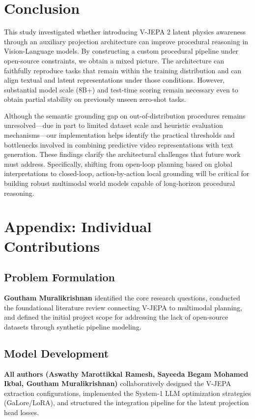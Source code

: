 \documentclass{article}
\begin{document}
\section{Conclusion}
This study investigated whether introducing V-JEPA 2 latent physics awareness through an auxiliary projection architecture can improve procedural reasoning in Vision-Language models. By constructing a custom procedural pipeline under open-source constraints, we obtain a mixed picture. The architecture can faithfully reproduce tasks that remain within the training distribution and can align textual and latent representations under those conditions. However, substantial model scale (8B+) and test-time scoring remain necessary even to obtain partial stability on previously unseen zero-shot tasks.

Although the semantic grounding gap on out-of-distribution procedures remains unresolved---due in part to limited dataset scale and heuristic evaluation mechanisms---our implementation helps identify the practical thresholds and bottlenecks involved in combining predictive video representations with text generation. These findings clarify the architectural challenges that future work must address. Specifically, shifting from open-loop planning based on global interpretations to closed-loop, action-by-action local grounding will be critical for building robust multimodal world models capable of long-horizon procedural reasoning.




\clearpage
\appendix
\section{Appendix: Individual Contributions}

\subsection{Problem Formulation}
\textbf{Goutham Muralikrishnan} identified the core research questions, conducted the foundational literature review connecting V-JEPA to multimodal planning, and defined the initial project scope for addressing the lack of open-source datasets through synthetic pipeline modeling.

\subsection{Model Development}
\textbf{All authors (Aswathy Marottikkal Ramesh, Sayeeda Begam Mohamed Ikbal, Goutham Muralikrishnan)} collaboratively designed the V-JEPA extraction configurations, implemented the System-1 LLM optimization strategies (GaLore/LoRA), and structured the integration pipeline for the latent projection head losses.
\end{document}
